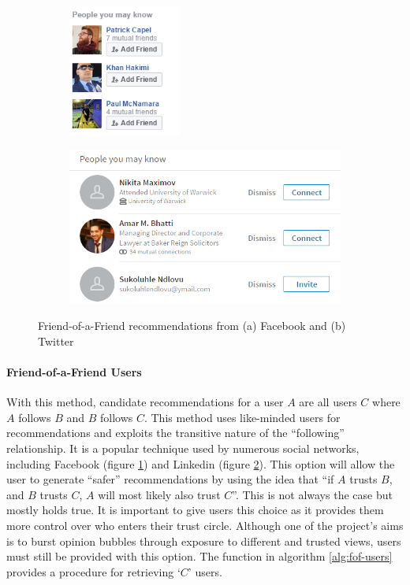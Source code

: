 \begin{figure}[H]
    \centering
    \begin{subfigure}[b]{.3\linewidth}
        \includegraphics[height=1.7in]{Images/Design/facebook}
        \caption{}
        \label{fig:fof-facebook}
    \end{subfigure}
    \begin{subfigure}[b]{.5\linewidth}
        \includegraphics[width=1\linewidth]{Images/Design/linkedin}
        \caption{}
        \label{fig:fof-linkedin}
    \end{subfigure}
    \caption{Friend-of-a-Friend recommendations from (a) Facebook and (b) Twitter}
    \label{fig:fof}
\end{figure}

\paragraph{Friend-of-a-Friend Users}
With this method, candidate recommendations for a user $A$ are all users $C$ where $A$ follows $B$ and $B$ follows $C$. This method uses like-minded users for recommendations and exploits the transitive nature of the ``following'' relationship. It is a popular technique used by numerous social networks, including Facebook (figure \ref{fig:fof-facebook}) and Linkedin (figure \ref{fig:fof-linkedin}). This option will allow the user to generate ``safer'' recommendations by using the idea that ``if $A$ trusts $B$, and $B$ trusts $C$, $A$ will most likely also trust $C$''. This is not always the case but mostly holds true. It is important to give users this choice as it provides them more control over who enters their trust circle. Although one of the project's aims is to burst opinion bubbles through exposure to different and trusted views, users must still be provided with this option. The function in algorithm \ref{alg:fof-users} provides a procedure for retrieving `$C$' users. 

